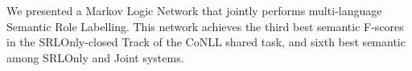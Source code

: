 

We presented a Markov Logic Network that jointly performs multi-language 
Semantic Role Labelling. This network achieves the third best semantic F-scores 
in the SRLOnly-closed Track of the CoNLL shared task, and sixth best semantic 
among SRLOnly and Joint systems.

